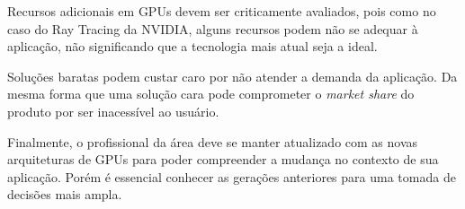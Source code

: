 \documentclass[letterpaper, 10 pt, conference]{ieeeconf}  %
\begin{document}
Recursos adicionais em GPUs devem ser criticamente avaliados, pois como no caso do Ray Tracing da NVIDIA, alguns recursos podem não se adequar à aplicação, não significando que a tecnologia mais atual seja a ideal.

Soluções baratas podem custar caro por não atender a demanda da aplicação. Da mesma forma que uma solução cara pode comprometer o \textit{market share} do produto por ser inacessível ao usuário.

Finalmente, o profissional da área deve se manter atualizado com as novas arquiteturas de GPUs para poder compreender a mudança no contexto de sua aplicação. Porém é essencial conhecer as gerações anteriores para uma tomada de decisões mais ampla.



\addtolength{\textheight}{-12cm}   %

\end{document}
